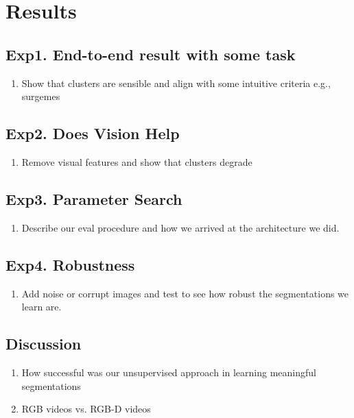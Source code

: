 \section{Results}
\subsection{Exp1. End-to-end result with some task}

\begin{enumerate}
\item Show that clusters are sensible and align with some intuitive criteria e.g., surgemes
\end{enumerate}

\subsection{Exp2. Does Vision Help}

\begin{enumerate}
\item Remove visual features and show that clusters degrade
\end{enumerate}

\subsection{Exp3. Parameter Search}

\begin{enumerate}
\item Describe our eval procedure and how we arrived at the architecture we did.
\end{enumerate}

\subsection{Exp4. Robustness}
\begin{enumerate}
\item Add noise or corrupt images and test to see how robust the segmentations we learn are.
\end{enumerate}


\subsection{Discussion}
\begin{enumerate}
\item How successful was our unsupervised approach in learning meaningful segmentations
\item RGB videos vs. RGB-D videos
\end{enumerate}

